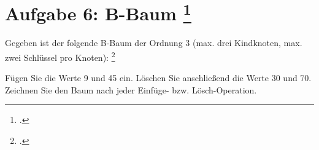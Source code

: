 \documentclass{lehramt-informatik-aufgabe}
\begin{document}

\section{Aufgabe 6: B-Baum
\footcite[Thema 2 Teilaufgabe 1 Aufgabe 3]{examen:66116:2015:09}
}

Gegeben ist der folgende B-Baum der Ordnung 3 (max. drei Kindknoten,
max. zwei Schlüssel pro Knoten):
\footcite[Seite 3 und 4, (Einfügen und Löschen-Operation a)]{aud:ab:7}


\noindent
Fügen Sie die Werte 9 und 45 ein. Löschen Sie anschließend die Werte 30
und 70. Zeichnen Sie den Baum nach jeder Einfüge- bzw. Lösch-Operation.
\end{document}
